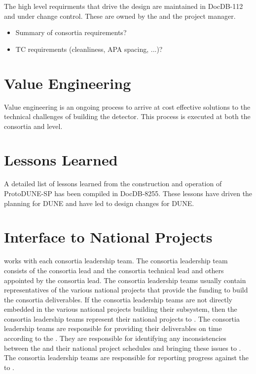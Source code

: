 The high level  requirments that drive the  design are
maintained in DocDB-112 and under change control. These are owned by
the   and the  project manager.

\begin{itemize}
 \item Summary of consortia requirements?
 \item TC requirements (cleanliness, APA spacing, ...)?
\end{itemize}


\section{Value Engineering}
\label{sec:fdsp-coord-ve}

Value engineering is an ongoing process to arrive at cost effective solutions to the technical challenges of building the  detector.
This process is executed at both the consortia and  level.

\section{Lessons Learned}
\label{sec:fdsp-coord-lessons}

A detailed list of lessons learned from the construction and operation
of ProtoDUNE-SP has been compiled in DocDB-8255. These lessons have driven the
planning for DUNE and have led to design changes for DUNE.

\section{Interface to National Projects}
\label{sec:fdsp-coord-national}

  works with each consortia leadership team. The
consortia leadership team consists of the consortia lead and the
consortia technical lead and others appointed by the consortia
lead. The consortia leadership teams usually contain representatives
of the various national projects that provide the funding to build the consortia
deliverables. If the consortia leadership teams are not directly
embedded in the various national projects building their subsystem,
then the consortia leadership teams represent their national projects
to . The consortia leadership teams are responsible for
providing their deliverables on time according to the
. They are responsible for identifying any inconsistencies
between the  and their national project schedules and
bringing these issues to . The consortia leadership teams
are responsible for reporting progress against the  to
.

